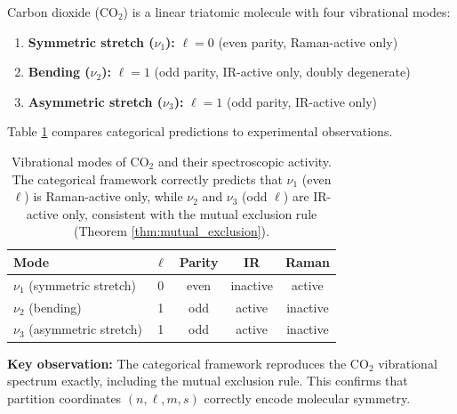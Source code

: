 \documentclass[twocolumn,10pt]{article}
\theoremstyle{remark}
\begin{document}
Carbon dioxide (CO$_2$) is a linear triatomic molecule with four vibrational modes:

\begin{enumerate}
    \item \textbf{Symmetric stretch ($\nu_1$):} $\ell = 0$ (even parity, Raman-active only)
    \item \textbf{Bending ($\nu_2$):} $\ell = 1$ (odd parity, IR-active only, doubly degenerate)
    \item \textbf{Asymmetric stretch ($\nu_3$):} $\ell = 1$ (odd parity, IR-active only)
\end{enumerate}

Table \ref{tab:CO2_spectrum} compares categorical predictions to experimental observations.

\begin{table}[h]
\centering
\begin{tabular}{lcccc}
\hline
\textbf{Mode} & $\boldsymbol{\ell}$ & \textbf{Parity} & \textbf{IR} & \textbf{Raman} \\
\hline
$\nu_1$ (symmetric stretch) & 0 & even & inactive & active \\
$\nu_2$ (bending) & 1 & odd & active & inactive \\
$\nu_3$ (asymmetric stretch) & 1 & odd & active & inactive \\
\hline
\end{tabular}
\caption{Vibrational modes of CO$_2$ and their spectroscopic activity. The categorical framework correctly predicts that $\nu_1$ (even $\ell$) is Raman-active only, while $\nu_2$ and $\nu_3$ (odd $\ell$) are IR-active only, consistent with the mutual exclusion rule (Theorem \ref{thm:mutual_exclusion}).}
\label{tab:CO2_spectrum}
\end{table}

\textbf{Key observation:} The categorical framework reproduces the CO$_2$ vibrational spectrum exactly, including the mutual exclusion rule. This confirms that partition coordinates $(n, \ell, m, s)$ correctly encode molecular symmetry.
\end{document}
